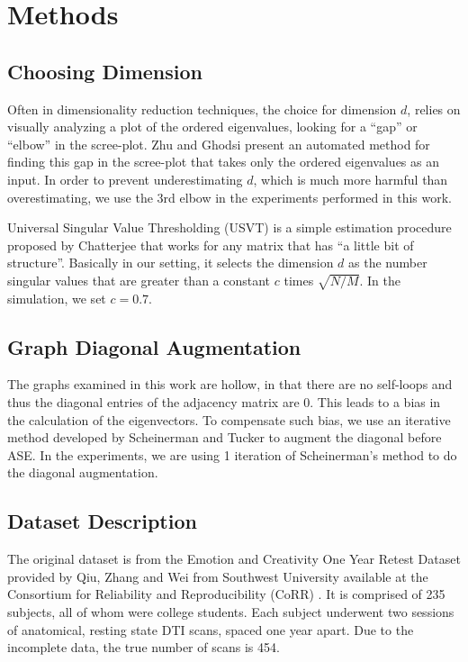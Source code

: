 \documentclass[a4paper]{article}
\begin{document}
\section{Methods}

\subsection{Choosing Dimension}
\label{section:dim_select}
Often in dimensionality reduction techniques, the choice for dimension $d$, relies on visually analyzing a plot of the ordered eigenvalues, looking for a ``gap'' or ``elbow'' in the scree-plot. Zhu and Ghodsi \cite{zhu2006automatic} present an automated method for finding this gap in the scree-plot that takes only the ordered eigenvalues as an input. In order to prevent underestimating $d$, which is much more harmful than overestimating, we use the 3rd elbow in the experiments performed in this work.

Universal Singular Value Thresholding (USVT) \cite{chatterjee2015matrix} is a simple estimation procedure proposed by Chatterjee that works for any matrix that has ``a little bit of structure''. Basically in our setting, it selects the dimension $d$ as the number singular values that are greater than a constant $c$ times $\sqrt{N/M}$. In the simulation, we set $c = 0.7$.



\subsection{Graph Diagonal Augmentation}
\label{section:diag_aug}
The graphs examined in this work are hollow, in that there are no self-loops and thus the diagonal entries of the adjacency matrix are 0. This leads to a bias in the calculation of the eigenvectors. To compensate such bias, we use an iterative method developed by Scheinerman and Tucker \cite{scheinerman2010modeling} to augment the diagonal before ASE. In the experiments, we are using 1 iteration of Scheinerman's method to do the diagonal augmentation.



\subsection{Dataset Description}
\label{section:data}
The original dataset is from the Emotion and Creativity One Year Retest Dataset provided by Qiu, Zhang and Wei from Southwest University available at the Consortium for Reliability and Reproducibility (CoRR) \cite{zuo2014open, gorgolewski2015high}. It is comprised of 235 subjects, all of whom were college students. Each subject underwent two sessions of anatomical, resting state DTI scans, spaced one year apart. Due to the incomplete data, the true number of scans is 454.
\end{document}
